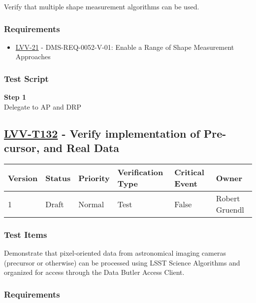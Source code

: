 Verify that multiple shape measurement algorithms can be used.

\subsubsection{Requirements}\label{requirements-8}

\begin{itemize}
\tightlist
\item
  \href{https://jira.lsstcorp.org/browse/LVV-21}{LVV-21} -
  DMS-REQ-0052-V-01: Enable a Range of Shape Measurement Approaches
\end{itemize}

\subsubsection{Test Script}\label{test-script-8}

\textbf{Step 1}\\
Delegate to AP and DRP\\[2\baselineskip]

\hypertarget{lvv-t132---verify-implementation-of-pre-cursor-and-real-data}{\subsection{\texorpdfstring{\href{https://jira.lsstcorp.org/secure/Tests.jspa\#/testCase/LVV-T132}{LVV-T132}
- Verify implementation of Pre-cursor, and Real
Data}{LVV-T132 - Verify implementation of Pre-cursor, and Real Data}}\label{lvv-t132---verify-implementation-of-pre-cursor-and-real-data}}

\begin{longtable}[]{@{}llllll@{}}
\toprule
Version & Status & Priority & Verification Type & Critical Event &
Owner\tabularnewline
\midrule
\endhead
1 & Draft & Normal & Test & False & Robert Gruendl\tabularnewline
\bottomrule
\end{longtable}

\subsubsection{Test Items}\label{test-items-9}

Demonstrate that pixel-oriented data from astronomical imaging cameras
(precursor or otherwise) can be processed using LSST Science Algorithms
and organized for access through the Data Butler Access Client. ~

\subsubsection{Requirements}\label{requirements-9}


